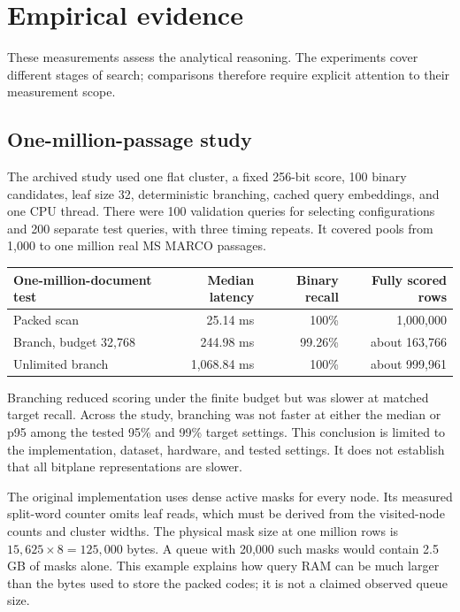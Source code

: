 \section{Empirical evidence}
\label{sec:evidence}
These measurements assess the analytical reasoning. The experiments cover different stages
of search; comparisons therefore require explicit attention to their measurement scope.

\subsection{One-million-passage study}
The archived study used one flat cluster, a fixed 256-bit score, 100 binary candidates,
leaf size 32, deterministic branching, cached query embeddings, and one CPU thread.
There were 100 validation queries for selecting configurations and 200 separate test queries,
with three timing repeats. It covered pools from 1,000 to one million real MS MARCO passages.

\begin{center}
\begin{tabular}{@{}lrrr@{}}\toprule
One-million-document test & Median latency & Binary recall & Fully scored rows\\\midrule
Packed scan & 25.14 ms & 100\% & 1,000,000\\
Branch, budget 32,768 & 244.98 ms & 99.26\% & about 163,766\\
Unlimited branch & 1,068.84 ms & 100\% & about 999,961\\\bottomrule
\end{tabular}
\end{center}
Branching reduced scoring under the finite budget but was slower at matched target recall.
Across the study, branching was not faster at either the median or p95 among the tested 95\% and 99\% target settings.
This conclusion is limited to the implementation, dataset, hardware, and tested settings.
It does not establish that all bitplane representations are slower.

The original implementation uses dense active masks for every node. Its measured split-word
counter omits leaf reads, which must be derived from the visited-node counts and cluster widths.
The physical mask size at one million rows is $15{,}625\times8=125{,}000$ bytes. A queue with
20,000 such masks would contain 2.5 GB of masks alone. This example explains how query RAM can
be much larger than the bytes used to store the packed codes; it is not a claimed observed queue size.

